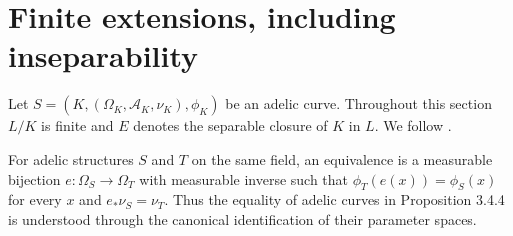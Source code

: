 \section{Finite extensions, including inseparability}

Let $S=(K,(\Omega_K,\mathcal A_K,\nu_K),\phi_K)$ be an adelic
curve. Throughout this section $L/K$ is finite and $E$ denotes the
separable closure of $K$ in $L$. We follow
\cite[\S3.4.1]{chen-moriwaki}.

\begin{definition}
\label{def:adelic-equivalence}
\leanok
{}
For adelic structures $S$ and $T$ on the same field, an equivalence is a
measurable bijection $e:\Omega_S\to\Omega_T$ with measurable inverse such
that $\phi_T(e(x))=\phi_S(x)$ for every $x$ and $e_*\nu_S=\nu_T$.
Thus the equality of adelic curves in Proposition 3.4.4 is understood
through the canonical identification of their parameter spaces.
\end{definition}

